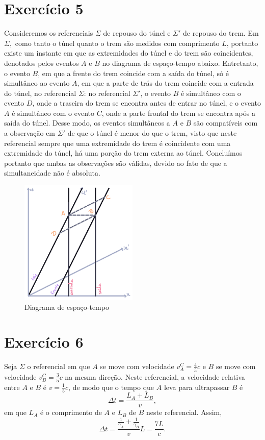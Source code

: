 \documentclass[12pt,a4paper]{article}
\numberwithin{equation}{section}
\begin{document}
\section*{Exercício 5}

Consideremos os referenciais \(\Sigma\) de repouso do túnel e \(\Sigma'\) de repouso do trem. Em \(\Sigma,\) como tanto o túnel quanto o trem são medidos com comprimento \(L\), portanto existe um instante em que as extremidades do túnel e do trem são coincidentes, denotados pelos eventos \(A\) e \(B\) no diagrama de espaço-tempo abaixo. Entretanto, o evento \(B\), em que a frente do trem coincide com a saída do túnel, só é simultâneo ao evento \(A\), em que a parte de trás do trem coincide com a entrada do túnel, no referencial \(\Sigma\): no referencial \(\Sigma'\), o evento \(B\) é simultâneo com o evento \(D\), onde a traseira do trem se encontra antes de entrar no túnel, e o evento \(A\) é simultâneo com o evento \(C\), onde a parte frontal do trem se encontra após a saída do túnel. Desse modo, os eventos simultâneos a \(A\) e \(B\) são compatíveis com a observação em \(\Sigma'\) de que o túnel é menor do que o trem, visto que neste referencial sempre que uma extremidade do trem é coincidente com uma extremidade do túnel, há uma porção do trem externa ao túnel. Concluímos portanto que ambas as observações são válidas, devido ao fato de que a simultaneidade não é absoluta.

\begin{figure}[H]
    \centering
    \includegraphics[width=0.5\textwidth]{tunel_trem.png}
    \caption{Diagrama de espaço-tempo}
\end{figure}

\section*{Exercício 6}
Seja \(\Sigma\) o referencial em que \(A\) se move com velocidade \(v_A^C=\frac45c\) e \(B\) se move com velocidade \(v_B^C = \frac35c\) na mesma direção. Neste referencial, a velocidade relativa entre \(A\) e \(B\) é \(v = \frac15c\), de modo que o tempo que \(A\) leva para ultrapassar \(B\) é
\begin{equation*}
    \Delta t = \frac{L_A + L_B}{v},
\end{equation*}
em que \(L_A\) é o comprimento de \(A\) e \(L_B\) de \(B\) neste referencial. Assim,
\begin{equation*}
    \Delta t = \frac{\frac{1}{\gamma_A} + \frac{1}{\gamma_B}}{v}L = \frac{7L}{c}.
\end{equation*}
\end{document}
